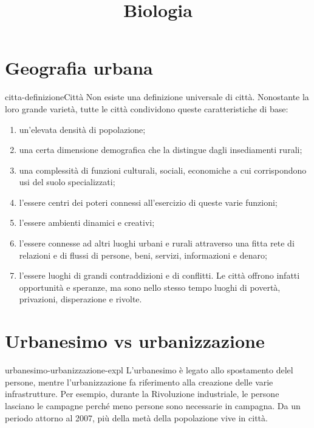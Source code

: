 \documentclass[preview]{standalone}
\begin{document}
\title{Biologia}
\genpage

\section{Geografia urbana}

\begin{snippetdefinition}{citta-definizione}{Città}
    Non esiste una definizione universale di città.
    Nonostante la loro grande varietà, tutte le città condividono queste
    caratteristiche di base:
    \begin{enumerate}
        \item un'elevata densità di popolazione;
        \item una certa dimensione demografica che la distingue dagli
        insediamenti rurali;
        \item una complessità di funzioni culturali, sociali, economiche a cui
        corrispondono usi del suolo specializzati;
        \item l'essere centri dei poteri connessi all'esercizio di queste varie
        funzioni;
        \item l'essere ambienti dinamici e creativi;
        \item l'essere connesse ad altri luoghi urbani e rurali attraverso una
        fitta rete di relazioni e di flussi di persone, beni, servizi,
        informazioni e denaro;
        \item l'essere luoghi di grandi contraddizioni e di conflitti. Le città
        offrono infatti opportunità e speranze, ma sono nello stesso
        tempo luoghi di povertà, privazioni, disperazione e rivolte.
    \end{enumerate}
\end{snippetdefinition}

\section{Urbanesimo vs urbanizzazione}

\begin{snippet}{urbanesimo-urbanizzazione-expl}
    L'urbanesimo è legato allo spostamento delel persone,
    mentre l'urbanizzazione fa riferimento alla creazione delle varie infrastrutture.
    Per esempio, durante la Rivoluzione industriale, le persone lasciano le campagne
    perché meno persone sono necessarie in campagna.
    Da un periodo attorno al 2007, più della metà della popolazione vive in città.
\end{snippet}
\end{document}
